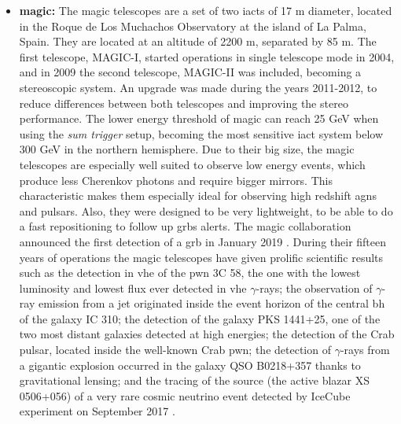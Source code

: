 \documentclass[main.tex]{subfiles}
\begin{document}
\begin{itemize}
\item \textbf{\gls{magic}:} The \gls{magic} telescopes are a set of two \glspl{iact} of 17 m diameter, located in the Roque de Los Muchachos Observatory at the island of La Palma, Spain. They are located at an altitude of 2200 m, separated by 85 m. The first telescope, MAGIC-I, started operations in single telescope mode in 2004, and in 2009 the second telescope, MAGIC-II was included, becoming a stereoscopic system. An upgrade was made during the years 2011-2012, to reduce differences between both telescopes and improving the stereo performance.
  The lower energy threshold of \gls{magic} can reach 25 GeV when using the \textit{sum trigger} setup, becoming the most sensitive \gls{iact} system below 300 GeV in the northern hemisphere.
  Due to their big size, the \gls{magic} telescopes are especially well suited to observe low energy events, which produce less Cherenkov photons and require bigger mirrors. This characteristic makes them especially ideal for observing high redshift \glspl{agn} and pulsars. Also, they were designed to be very lightweight, to be able to do a fast repositioning to follow up \glspl{grb} alerts. The \gls{magic} collaboration announced the first detection of a \gls{grb} in January 2019 \cite{2019MAGICGRB}.
  During their fifteen years of operations the \gls{magic} telescopes have given prolific scientific results such as the detection in \gls{vhe} of the \gls{pwn} 3C 58, the one with the lowest luminosity and lowest flux ever detected in \gls{vhe} $\gamma$-rays; the observation of $\gamma$-ray emission from a jet originated inside the event horizon of the central \gls{bh} of the galaxy IC 310; the detection of the galaxy PKS 1441+25, one of the two most distant galaxies detected at high energies; the detection of the Crab pulsar, located inside the well-known Crab \gls{pwn}; the detection of $\gamma$-rays from a gigantic explosion occurred in the galaxy QSO B0218+357 thanks to gravitational lensing; and the tracing of the source (the active blazar XS 0506+056) of a very rare cosmic neutrino event detected by IceCube experiment on September 2017 \cite{MAGICweb}.\\


\end{itemize}
\end{document}
